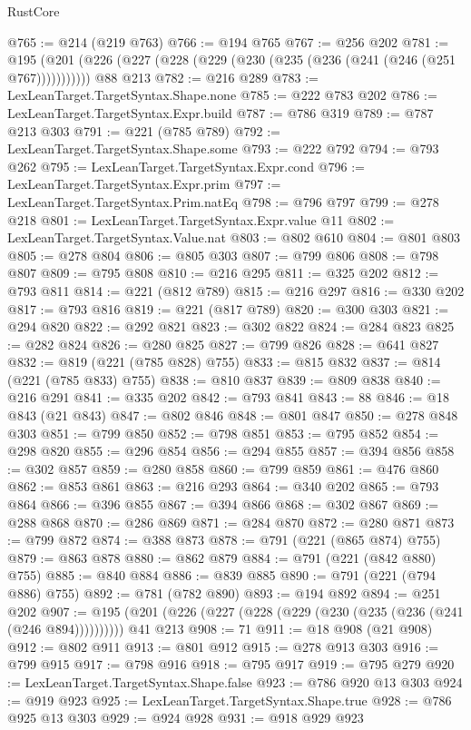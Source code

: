 \begin{lexlean}{RustCore}
\begin{coremodule}
@765 := @214 (@219 @763)
@766 := @194 @765
@767 := @256 @202
@781 := @195
    (@201 (@226 (@227 (@228 (@229 (@230 (@235 (@236 (@241 (@246 (@251 @767)))))))))))
    @88
    @213
@782 := @216 @289
@783 := LexLeanTarget.TargetSyntax.Shape.none
@785 := @222 @783 @202
@786 := LexLeanTarget.TargetSyntax.Expr.build
@787 := @786 @319
@789 := @787 @213 @303
@791 := @221 (@785 @789)
@792 := LexLeanTarget.TargetSyntax.Shape.some
@793 := @222 @792
@794 := @793 @262
@795 := LexLeanTarget.TargetSyntax.Expr.cond
@796 := LexLeanTarget.TargetSyntax.Expr.prim
@797 := LexLeanTarget.TargetSyntax.Prim.natEq
@798 := @796 @797
@799 := @278 @218
@801 := LexLeanTarget.TargetSyntax.Expr.value @11
@802 := LexLeanTarget.TargetSyntax.Value.nat
@803 := @802 @610
@804 := @801 @803
@805 := @278 @804
@806 := @805 @303
@807 := @799 @806
@808 := @798 @807
@809 := @795 @808
@810 := @216 @295
@811 := @325 @202
@812 := @793 @811
@814 := @221 (@812 @789)
@815 := @216 @297
@816 := @330 @202
@817 := @793 @816
@819 := @221 (@817 @789)
@820 := @300 @303
@821 := @294 @820
@822 := @292 @821
@823 := @302 @822
@824 := @284 @823
@825 := @282 @824
@826 := @280 @825
@827 := @799 @826
@828 := @641 @827
@832 := @819 (@221 (@785 @828) @755)
@833 := @815 @832
@837 := @814 (@221 (@785 @833) @755)
@838 := @810 @837
@839 := @809 @838
@840 := @216 @291
@841 := @335 @202
@842 := @793 @841
@843 := 88
@846 := @18 @843 (@21 @843)
@847 := @802 @846
@848 := @801 @847
@850 := @278 @848 @303
@851 := @799 @850
@852 := @798 @851
@853 := @795 @852
@854 := @298 @820
@855 := @296 @854
@856 := @294 @855
@857 := @394 @856
@858 := @302 @857
@859 := @280 @858
@860 := @799 @859
@861 := @476 @860
@862 := @853 @861
@863 := @216 @293
@864 := @340 @202
@865 := @793 @864
@866 := @396 @855
@867 := @394 @866
@868 := @302 @867
@869 := @288 @868
@870 := @286 @869
@871 := @284 @870
@872 := @280 @871
@873 := @799 @872
@874 := @388 @873
@878 := @791 (@221 (@865 @874) @755)
@879 := @863 @878
@880 := @862 @879
@884 := @791 (@221 (@842 @880) @755)
@885 := @840 @884
@886 := @839 @885
@890 := @791 (@221 (@794 @886) @755)
@892 := @781 (@782 @890)
@893 := @194 @892
@894 := @251 @202
@907 := @195 (@201 (@226 (@227 (@228 (@229 (@230 (@235 (@236 (@241 (@246 @894)))))))))) @41 @213
@908 := 71
@911 := @18 @908 (@21 @908)
@912 := @802 @911
@913 := @801 @912
@915 := @278 @913 @303
@916 := @799 @915
@917 := @798 @916
@918 := @795 @917
@919 := @795 @279
@920 := LexLeanTarget.TargetSyntax.Shape.false
@923 := @786 @920 @13 @303
@924 := @919 @923
@925 := LexLeanTarget.TargetSyntax.Shape.true
@928 := @786 @925 @13 @303
@929 := @924 @928
@931 := @918 @929 @923

\end{coremodule}
\end{lexlean}
